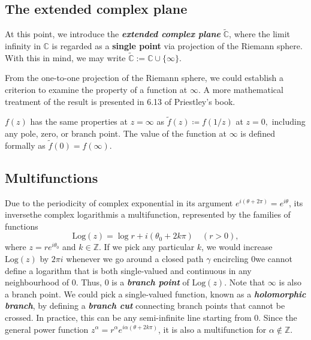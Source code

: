 \documentclass{article}
\begin{document}
\subsection{The extended complex plane}
At this point, we introduce the \textit{\textbf{extended complex plane}} $\widetilde{\mathbb{C}} $, where the limit infinity in $\mathbb{C}$ is regarded as a \textbf{single point} via projection of the Riemann sphere. With this in mind, we may write $\widetilde{\mathbb{C}} := \mathbb{C} \cup \{\infty \}. $

From the one-to-one projection of the Riemann sphere, we could establish a criterion to examine the property of a function at $\infty$. A more mathematical treatment of the result is presented in 6.13 of Priestley's book. 
\begin{frm-res}
    $f(z)$ has the same properties at $z=\infty $ as $\widetilde{f}(z)\coloneqq f(1/z)$ at $z=0,$ including any pole, zero, or branch point. The value of the function at $\infty$ is defined formally as 
    \(
        \widetilde{f}(0) = f(\infty ).
    \)
\end{frm-res}


\subsection{Multifunctions}
Due to the periodicity of complex exponential in its argument $e^{i(\theta+2\pi )} = e^{i \theta}$, its inverse\textemdash the complex logarithm\textemdash is a multifunction, represented by the families of functions 
\[
    \text{Log}(z) = \log{r} + i (\theta_{0} + 2 k \pi ) \quad (r>0),
\]
where $z = re^{i \theta_0}$ and $k \in \mathbb{Z}$. If we pick any particular $k$, we would increase $\text{Log}(z)$ by $2\pi i$ whenever we go around a closed path $\gamma$ encircling $0$\textemdash we cannot define a logarithm that is both single-valued and continuous in any neighbourhood of $0$. Thus, $0$ is a \textit{\textbf{branch point}} of $\text{Log}(z)$. Note that $\infty $ is also a branch point. We could pick a single-valued function, known as a \textit{\textbf{holomorphic branch}}, by defining a \textit{\textbf{branch cut}} connecting branch points that cannot be crossed. In practice, this can be any semi-infinite line starting from $0$. Since the general power function $z^{\alpha} = r^{\alpha } e^{i \alpha(\theta +2k \pi )}$, it is also a multifunction for $\alpha \notin \mathbb{Z}$. 
\end{document}
